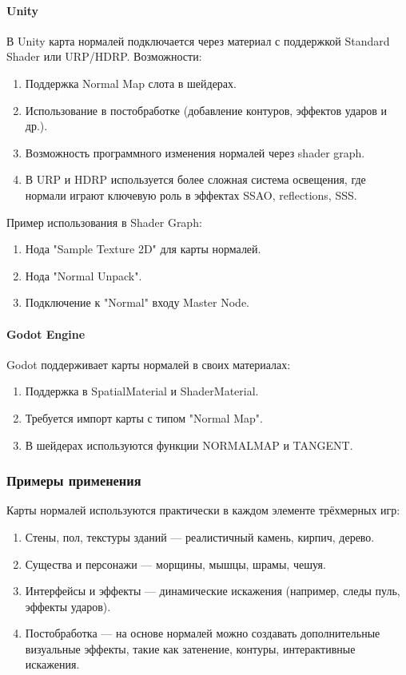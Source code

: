 \paragraph{Unity}

В Unity карта нормалей подключается через материал с поддержкой Standard Shader или URP/HDRP. Возможности:
\begin{enumerate}
	\item Поддержка Normal Map слота в шейдерах.
	\item Использование в постобработке (добавление контуров, эффектов ударов и др.).
	\item Возможность программного изменения нормалей через shader graph.
	\item В URP и HDRP используется более сложная система освещения, где нормали играют ключевую роль в эффектах SSAO, reflections, SSS.
\end{enumerate}

Пример использования в Shader Graph:
\begin{enumerate}
	\item Нода "Sample Texture 2D" для карты нормалей.
	\item Нода "Normal Unpack".
	\item Подключение к "Normal" входу Master Node.
\end{enumerate}
\paragraph{Godot Engine}

Godot поддерживает карты нормалей в своих материалах:
\begin{enumerate}
	\item Поддержка в SpatialMaterial и ShaderMaterial.
	\item Требуется импорт карты с типом "Normal Map".
	\item В шейдерах используются функции NORMALMAP и TANGENT.
\end{enumerate}
\subsubsection{Примеры применения}

Карты нормалей используются практически в каждом элементе трёхмерных игр:
\begin{enumerate}
	\item Стены, пол, текстуры зданий — реалистичный камень, кирпич, дерево.
	\item Существа и персонажи — морщины, мышцы, шрамы, чешуя.
	\item Интерфейсы и эффекты — динамические искажения (например, следы пуль, эффекты ударов).
	\item Постобработка — на основе нормалей можно создавать дополнительные визуальные эффекты, такие как затенение, контуры, интерактивные искажения.
\end{enumerate}
